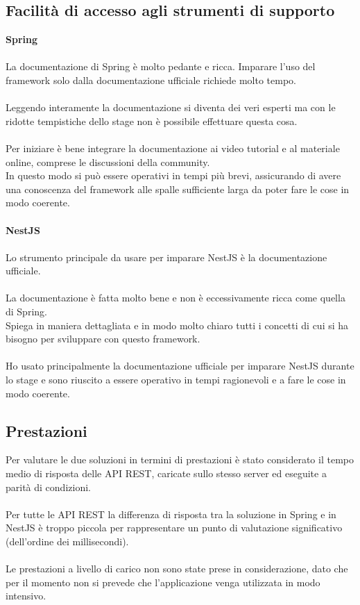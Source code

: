 \subsection{Facilità di accesso agli strumenti di supporto}
\textbf{Spring}
\\\\
La documentazione di Spring è molto pedante e ricca. Imparare l'uso del framework solo dalla documentazione 
ufficiale richiede molto tempo. 
\\\\
Leggendo interamente la documentazione si diventa dei veri esperti ma con le ridotte tempistiche
dello stage non è possibile effettuare questa cosa.
\\\\
Per iniziare è bene integrare la documentazione ai video tutorial e al materiale online, comprese le discussioni 
della community. 
\\
In questo modo si può essere operativi in tempi più brevi, assicurando di avere una conoscenza
del framework alle spalle sufficiente larga da poter fare le cose in modo coerente.
\\\\
\textbf{NestJS}
\\\\
Lo strumento principale da usare per imparare NestJS è la documentazione ufficiale.
\\\\
La documentazione è fatta molto bene e non è eccessivamente ricca come quella di Spring. 
\\
Spiega in maniera dettagliata
e in modo molto chiaro tutti i concetti di cui si ha bisogno per sviluppare con questo framework.
\\\\
Ho usato principalmente la documentazione ufficiale per imparare NestJS durante lo stage e sono riuscito a essere
operativo in tempi ragionevoli e a fare le cose in modo coerente.
\subsection{Prestazioni}
Per valutare le due soluzioni in termini di prestazioni è stato considerato il tempo medio di risposta delle \gls{API} \gls{REST}, 
caricate sullo stesso 
server ed eseguite a parità di condizioni.
\\\\
Per tutte le \gls{API} \gls{REST} la differenza di risposta tra la soluzione in Spring e in NestJS è troppo piccola per rappresentare un punto
di valutazione significativo (dell'ordine dei millisecondi).
\\\\
Le prestazioni a livello di carico non sono state prese in considerazione, dato che per il momento non si prevede che l'applicazione 
venga utilizzata in modo intensivo.
